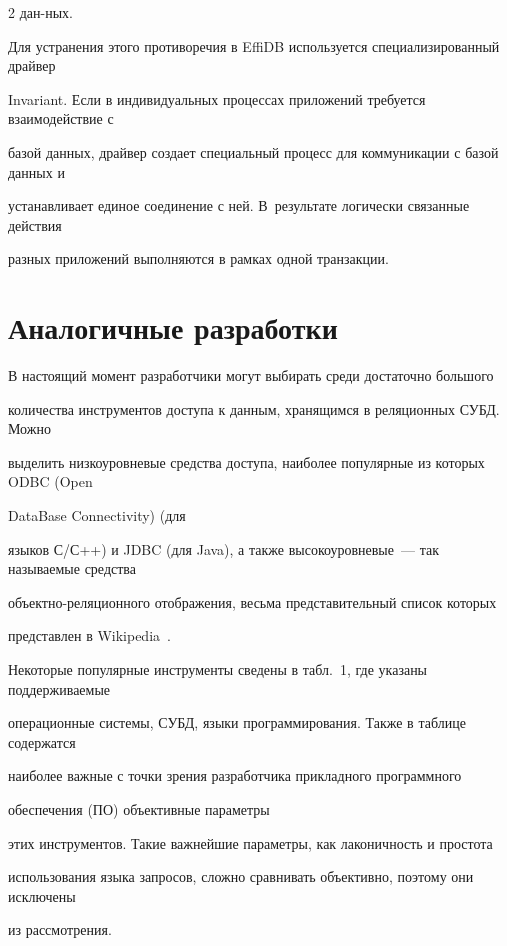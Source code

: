 \begin{multicols}{2}
дан-\linebreak ных.



Для устранения этого противоречия в EffiDB используется специализированный драйвер 

Invariant. Если в индивидуальных процессах приложений требуется взаимодействие с 

базой данных, драйвер создает специальный процесс для коммуникации с базой данных и 

устанавливает единое соединение с ней. В~результате логически связанные действия 

разных приложений выполняются в рамках одной транзакции.



\section{Аналогичные разработки}



В настоящий момент разработчики могут выбирать среди достаточно большого 

количества инструментов доступа к данным, хранящимся в реляционных СУБД. Можно 

выделить низкоуровневые средства доступа, наиболее популярные из которых ODBC (Open

DataBase Connectivity) (для 

языков С/С++) и JDBC (для Java), а также высокоуровневые~--- так называемые средства 

объект\-но-ре\-ля\-ци\-он\-но\-го отображения, весьма представительный список которых 

представлен в Wikipedia~\cite{6-y}.



Некоторые популярные инструменты сведены в табл.~1, где указаны поддерживаемые 

операционные системы, СУБД, языки программирования. Также в таблице содержатся 

наиболее важные с точки зрения разработчика прикладного программного

обеспечения (ПО) объективные параметры 

этих инструментов. Такие важнейшие параметры, как лаконичность и простота 

использования языка запросов, сложно сравнивать объективно, поэтому они исключены 

из рассмотрения.





\end{multicols}



